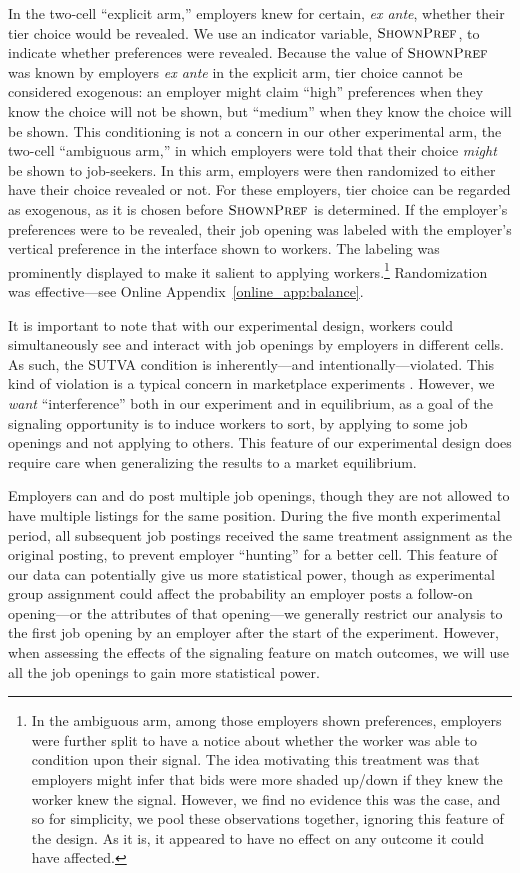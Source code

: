 \documentclass[12pt]{article}
\begin{document}
In the two-cell ``explicit arm,'' employers knew for certain, \emph{ex ante}, whether their tier choice would be revealed.
We use an indicator variable, $\textsc{ShownPref}$, to indicate whether preferences were revealed. 
Because the value of $\textsc{ShownPref}$ was known by employers \emph{ex ante} in the explicit arm, tier choice cannot be considered exogenous: 
an employer might claim ``high'' preferences when they know the choice will not be shown, but ``medium'' when they know the choice will be shown.
This conditioning is not a concern in our other experimental arm, the two-cell  ``ambiguous arm,'' in which employers were told that their choice \emph{might} be shown to job-seekers.
In this arm, employers were then randomized to either have their choice revealed or not. 
For these employers, tier choice can be regarded as exogenous, as it is chosen before $\textsc{ShownPref}$ is determined.
If the employer's preferences were to be revealed, their job opening was labeled with the employer's vertical preference in the interface shown to workers.
The labeling was prominently displayed to make it salient to applying workers.\footnote{
  In the ambiguous arm, among those employers shown preferences, employers were further split to have a notice about whether the worker was able to condition upon their signal.
  The idea motivating this treatment was that employers might infer that bids were more shaded up/down if they knew the worker knew the signal.
  However, we find no evidence this was the case, and so for simplicity, we pool these observations together, ignoring this feature of the design.
  As it is, it appeared to have no effect on any outcome it could have affected. 
}
Randomization was effective---see Online Appendix~\ref{online_app:balance}. 

It is important to note that with our experimental design, workers could simultaneously see and interact with job openings by employers in different cells. 
As such, the SUTVA condition is inherently---and intentionally---violated.
This kind of violation is a typical concern in marketplace experiments \citep{blake2014marketplace}.
However, we \emph{want} ``interference'' both in our experiment and in equilibrium, as a goal of the signaling opportunity is to induce workers to sort, by applying to some job openings and not applying to others.
This feature of our experimental design does require care when generalizing the results to a market equilibrium.

Employers can and do post multiple job openings, though they are not allowed to have multiple listings for the same position. 
During the five month experimental period, all subsequent job postings received the same treatment assignment as the original posting, to prevent employer ``hunting'' for a better cell.
This feature of our data can potentially give us more statistical power, though as experimental group assignment could affect the probability an employer posts a follow-on opening---or the attributes of that opening---we generally restrict our analysis to the first job opening by an employer after the start of the experiment.  
However, when assessing the effects of the signaling feature on match outcomes, we will use all the job openings to gain more statistical power.
\end{document}
